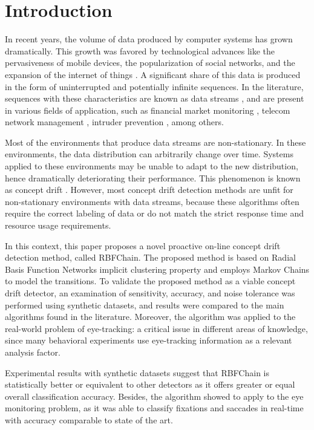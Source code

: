 \documentclass[preprint,12pt]{elsarticle}
\begin{document}
\section{Introduction}
\label{sec:intro}
In recent years,
the volume of data produced by computer systems has grown dramatically.
This growth was favored by technological advances like
the pervasiveness of mobile devices,
the popularization of social networks, and
the expansion of the internet of things \cite{Cohen:BigData:2009:MSN:1687553.1687576}.
%
A significant share of this data is produced in the form of uninterrupted and potentially infinite sequences.
In the literature,
sequences with these characteristics are known as data streams \cite{Aggarwal:2006:DSM:1196418},
and are present in various fields of application,
such as financial market monitoring  \cite{ZHOU:2015},
telecom network management \cite{delattre2015method},
 intruder prevention \cite{KENKRE:PAI:COLACO:2015},
 among others.

Most of the environments that produce data streams are non-stationary.
In these environments, the data distribution can arbitrarily change over time.
Systems applied to these environments may be unable to adapt to the new distribution, hence dramatically deteriorating their performance.
This phenomenon is known as concept drift \cite{Gama:2014:DAF:2670967.2670971}.
%
However, most concept drift detection methods are unfit for non-stationary environments with data streams,
because these algorithms often require the correct labeling of data or do not match the strict response time and resource usage requirements.

In this context, this paper proposes a novel proactive on-line concept drift detection method, called RBFChain.
The proposed method is based on Radial Basis Function Networks implicit clustering property
and employs Markov Chains to model the transitions.
To validate the proposed method as a viable concept drift detector,
an examination of sensitivity, accuracy,
and noise tolerance was performed using synthetic datasets,
and results were compared to the main algorithms found in the literature.
%
Moreover, the algorithm was applied to the real-world problem of eye-tracking: a critical issue in different areas of knowledge,
since many behavioral experiments use eye-tracking information as a relevant analysis factor.

Experimental results with synthetic datasets suggest that RBFChain is statistically better or equivalent to other detectors as it offers greater or equal overall classification accuracy.
Besides, the algorithm showed to apply to the eye monitoring problem, as it was able to classify fixations and saccades in real-time with accuracy comparable to state of the art.
\end{document}
